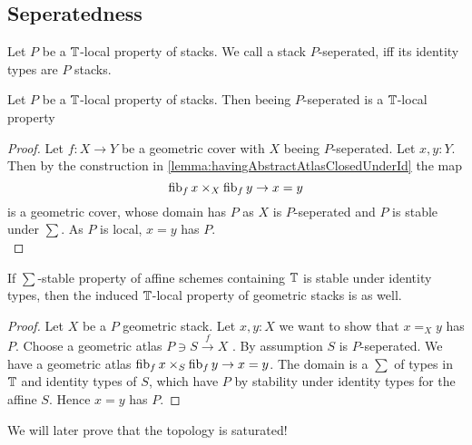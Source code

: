 \subsection{Seperatedness}
\begin{definition}
Let $P$ be a $\mathbb{T}$-local property of stacks.
We call a stack $P$-seperated, iff its identity types are $P$ stacks.
\end{definition}


\begin{lemma}{\label{lemma:SeperationIsLocal}}
	Let $P$ be a $\mathbb{T}$-local property of stacks. Then beeing $P$-seperated is a $\mathbb{T}$-local property %
\end{lemma}
\begin{proof}
	Let $f : X \to Y$ be a geometric cover with $X$ beeing $P$-seperated. Let $x , y : Y$. Then by the construction in \ref{lemma:havingAbstractAtlasClosedUnderId} the map
	\[
	\operatorname{fib}_f x \times_X \operatorname{fib}_f y \to x = y
	\]
	is a geometric cover, whose domain has $P$ as $X$ is $P$-seperated and $P$ is stable under $\sum$. As $P$ is local, $x = y$ has $P$. \\
\end{proof}
%

\begin{lemma}{\label{lemma:PImpliesPsep}}
	If $\sum$-stable property of affine schemes containing $\mathbb{T}$ is stable under identity types, then the induced $\mathbb{T}$-local property of geometric stacks is as well. %
\end{lemma}
\begin{proof}
	Let $X$ be a $P$ geometric stack. Let $x,y : X$ we want to show that $x =_X y$ has $P$. Choose a geometric atlas $P \ni S \overset{f}{\to} X$ . By assumption $S$ is $P$-seperated. We have a geometric atlas $\operatorname{fib}_f x \times_S \operatorname{fib}_f y \to x = y$. The domain is a $\sum$ of types in $\mathbb{T}$ and identity types of $S$, which have $P$ by stability under identity types for the affine $S$. Hence $x = y$ has $P$. 
\end{proof}

We will later prove that the \etale topology is saturated!